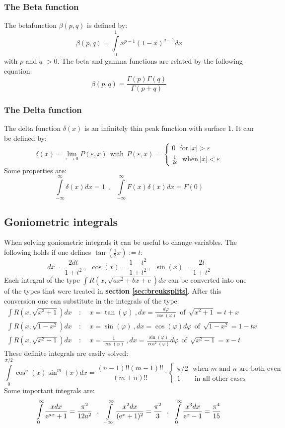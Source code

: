 \documentclass[a4paper,fancyheadings,twoside]{report}
\begin{document}
\subsubsection{The Beta function}
The betafunction $\beta(p,q)$ is defined by:
\[
\beta(p,q)=\int\limits_0^1x^{p-1}(1-x)^{q-1}dx
\]
with $p$ and $q$ $>0$. The beta and gamma functions are related by the
following equation:
\[
\beta(p,q)=\frac{\Gamma(p)\Gamma(q)}{\Gamma(p+q)}
\]

\subsubsection{The Delta function}
The delta function $\delta(x)$ is an infinitely thin peak function with
surface 1. It can be defined by:
\[
\delta(x)=\lim_{\varepsilon\rightarrow0}P(\varepsilon,x)~~\mbox{with}~~
P(\varepsilon,x)=\left\{
\begin{array}{l}
0~~~\mbox{for}~|x|>\varepsilon\\
\displaystyle\frac{1}{2\varepsilon}~~~\mbox{when}~|x|<\varepsilon
\end{array}\right.
\]
Some properties are:
\[
\int\limits_{-\infty}^\infty\delta(x)dx=1~~,~~~
\int\limits_{-\infty}^\infty F(x)\delta(x)dx=F(0)
\]

\subsection{Goniometric integrals}
When solving goniometric integrals it can be useful to change variables. The
following holds if one defines $\tan(\frac{1}{2}x):=t$:
\[
dx=\frac{2dt}{1+t^2}~,~~\cos(x)=\frac{1-t^2}{1+t^2}~,~~\sin(x)=\frac{2t}{1+t^2}
\]
Each integral of the type $\int R(x,\sqrt{ax^2+bx+c})dx$ can be converted into
one of the types that were treated in {\bf section \ref{sec:breuksplits}}.
After this conversion one can substitute in the integrals of the type:
\begin{eqnarray*}
\int R(x,\sqrt{x^2+1})dx&~:~~&x=\tan(\varphi)          ~,dx=\frac{d\varphi}{\cos(\varphi)}               ~~\mbox{of}~~\sqrt{x^2+1}=t+x\\
\int R(x,\sqrt{1-x^2})dx&~:~~&x=\sin(\varphi)          ~,dx=\cos(\varphi)d\varphi                        ~~\mbox{of}~~\sqrt{1-x^2}=1-tx\\
\int R(x,\sqrt{x^2-1})dx&~:~~&x=\frac{1}{\cos(\varphi)}~,dx=\frac{\sin(\varphi)}{\cos^2(\varphi)}d\varphi~~\mbox{of}~~\sqrt{x^2-1}=x-t
\end{eqnarray*}
These definite integrals are easily solved:
\[
\int\limits_0^{\pi/2}\cos^n(x)\sin^m(x)dx=\frac{(n-1)!!(m-1)!!}{(m+n)!!}\cdot
\left\{\begin{array}{l}
\pi/2\mbox{~~when $m$ and $n$ are both even}\\
1\mbox{~~~~~~in all other cases}
\end{array}\right.
\]
Some important integrals are:
\[
\int\limits_0^\infty\frac{xdx}{{\rm e}^{ax}+1}=\frac{\pi^2}{12a^2}~~,~~
\int\limits_{-\infty}^\infty\frac{x^2dx}{({\rm e}^x+1)^2}=\frac{\pi^2}{3}~~,~~
\int\limits_0^\infty\frac{x^3dx}{{\rm e}^x-1}=\frac{\pi^4}{15}
\]
\end{document}

